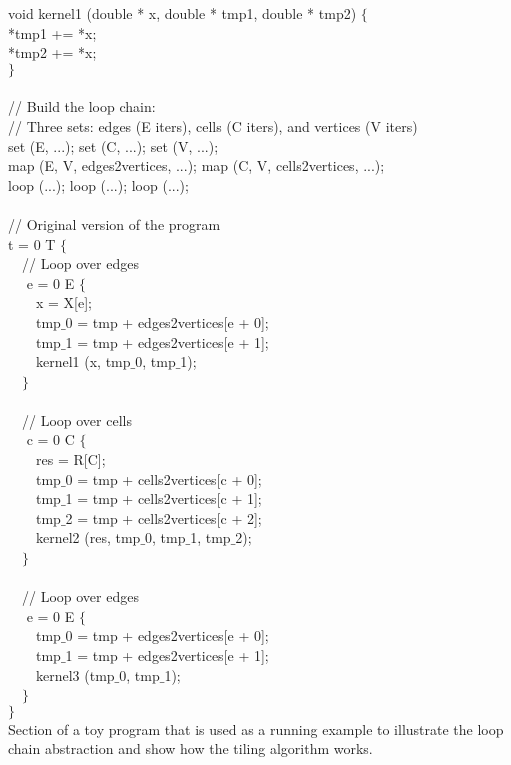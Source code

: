 \begin{algorithm}
\scriptsize\ttfamily
{}

void kernel1 (double * x, double * tmp1, double * tmp2) $\lbrace$\\
  *tmp1 += *x;\\
  *tmp2 += *x;\\
$\rbrace$\\
~\\
// Build the loop chain: \\
// Three sets: edges (E iters), cells (C iters), and vertices (V iters)\\
set (E, ...); set (C, ...); set (V, ...); \\ 
map (E, V, edges2vertices, ...); map (C, V, cells2vertices, ...); \\  
loop (...); loop (...); loop (...); \\
~\\
// Original version of the program\\
 t = 0  T $\lbrace$\\
~~// Loop over edges\\
~~ e = 0  E $\lbrace$\\
~~~~x = X[e];\\
~~~~tmp$\_$0 = tmp + edges2vertices[e + 0];\\
~~~~tmp$\_$1 = tmp + edges2vertices[e + 1]; \\
~~~~kernel1 (x, tmp$\_0$, tmp$\_$1);\\
~~$\rbrace$\\
~\\
~~// Loop over cells\\
~~ c = 0  C $\lbrace$\\
~~~~res = R[C];\\
~~~~tmp$\_$0 = tmp + cells2vertices[c + 0];\\
~~~~tmp$\_$1 = tmp + cells2vertices[c + 1];\\
~~~~tmp$\_$2 = tmp + cells2vertices[c + 2];\\
~~~~kernel2 (res, tmp$\_0$, tmp$\_$1, tmp$\_$2);\\
~~$\rbrace$\\
~\\
~~// Loop over edges\\
~~ e = 0  E $\lbrace$\\
~~~~tmp$\_$0 = tmp + edges2vertices[e + 0];\\
~~~~tmp$\_$1 = tmp + edges2vertices[e + 1]; \\
~~~~kernel3 (tmp$\_0$, tmp$\_$1);\\
~~$\rbrace$\\
$\rbrace$\\

\caption{Section of a toy program that is used as a running example to illustrate the loop chain abstraction and show how the tiling algorithm works.}
\label{code:tiling-loopchain}
\end{algorithm}


